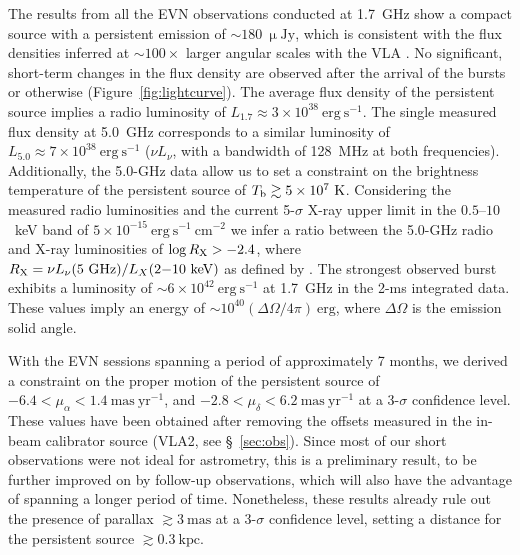 \documentclass[twocolumn]{aastex61}
\begin{document}
The results from all the EVN observations conducted at 1.7~GHz show a compact source with a persistent emission of $\sim 180\ \mathrm{\upmu Jy}$, which is consistent with the flux densities inferred at $\sim 100\times$ larger angular scales with the VLA \citep{chatterjee2017}. No significant, short-term changes in the flux density are observed after the arrival of the bursts or otherwise (Figure~\ref{fig:lightcurve}). The average flux density of the persistent source implies a radio luminosity of $L_{1.7} \approx 3 \times 10^{38}\ \mathrm{erg\ s^{-1}}$. The single measured flux density at 5.0~GHz corresponds to a similar luminosity of $L_{5.0} \approx 7 \times 10^{38}\ \mathrm{erg\ s^{-1}}$ ($\nu L_{\nu}$, with a bandwidth of 128~MHz at both frequencies). Additionally, the 5.0-GHz data allow us to set a constraint on the brightness temperature of the persistent source of $T_{\rm b} \gtrsim 5 \times 10^7\ \mathrm{K}$.  Considering the measured radio luminosities and the current 5-$\sigma$ X-ray upper limit in the $0.5$--$10$~keV band of $5 \times 10^{-15}\ \mathrm{erg\ s^{-1}\ cm^{-2}}$ \citep[which implies $L_X < 5 \times 10^{41}\ \mathrm{erg\ s^{-1}}$]{chatterjee2017} we infer a ratio between the 5.0-GHz radio and X-ray luminosities of $\log R_{\rm X} > -2.4$, where $R_{\rm X} = \nu L_{\nu} (\mathrm{5~GHz}) / L_X (\mathrm{2{\rm -}10~keV})$ as defined by \citet{terashima2003}.  The strongest observed burst exhibits a luminosity of $\sim 6 \times 10^{42}\ \mathrm{erg\ s^{-1}}$ at 1.7~GHz in the 2-ms integrated data. These values imply an energy of $\sim 10^{40}(\Delta\Omega/ 4\pi)~\mathrm{erg}$, where $\Delta\Omega$ is the emission solid angle.

With the EVN sessions spanning a period of approximately 7 months, we derived a constraint on the proper motion of the persistent source of $-6.4 < \mu_{\alpha} < 1.4\ \mathrm{mas\ yr^{-1}}$, and $-2.8 < \mu_{\delta} < 6.2\ \mathrm{mas\ yr^{-1}}$ at a 3-$\sigma$ confidence level.  These values have been obtained after removing the offsets measured in the in-beam calibrator source (VLA2, see \S~\ref{sec:obs}).  Since most of our short observations were not ideal for astrometry, this is a preliminary result, to be further improved on by follow-up observations, which will also have the advantage of spanning a longer period of time.  Nonetheless, these results already rule out the presence of parallax $\gtrsim 3~\mathrm{mas}$ at a 3-$\sigma$ confidence level, setting a distance for the persistent source $\gtrsim 0.3~\mathrm{kpc}$.
\end{document}
